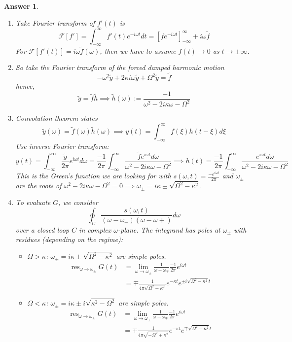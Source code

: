 \documentclass[a4paper]{article}
\DeclareMathOperator{\res}{res}
\newtheorem{ans}{Answer}[section]
\theoremstyle{new}
\begin{document}
\begin{ans}\leavevmode
\begin{enumerate}[label=(\alph*)]
\item Take Fourier transform of $f'(t)$ is
$$\mathcal{F}[f']=\int_{-\infty}^\infty f'(t)e^{-i\omega t}dt=[fe^{-i\omega t}]_{-\infty}^\infty +i\omega\tilde{f}$$
For $\mathcal{F}[f'(t)]=i\omega\tilde{f}(\omega)$, then we have to assume $f(t)\rightarrow 0$ as $t\rightarrow\pm\infty$.
\item So take the Fourier transform of the forced damped harmonic motion
$$-\omega^2\tilde{y}+2\kappa i\omega\tilde{y}+\Omega^2\tilde{y}=\tilde{f}$$
hence,
$$\tilde{y}=\tilde{f}\tilde{h}\implies\tilde{h}(\omega):=\frac{-1}{\omega^2-2i\kappa\omega-\Omega^2}$$
\item Convolution theorem states $$\tilde{y}(\omega)=\tilde{f}(\omega)\tilde{h}(\omega)\implies y(t)=\int_{-\infty}^\infty f(\xi)h(t-\xi)d\xi$$
Use inverse Fourier transform:
$$y(t)=\int_{-\infty}^\infty\frac{\tilde{y}}{2\pi}e^{i\omega t}d\omega=\frac{-1}{2\pi}\int_{-\infty}^\infty\frac{\tilde{f}e^{i\omega t}d\omega}{\omega^2-2i\kappa\omega-\Omega^2}\implies h(t)=\frac{-1}{2\pi}\int_{-\infty}^\infty\frac{e^{i\omega t}d\omega}{\omega^2-2i\kappa\omega-\Omega^2}$$
This is the Green's function we are looking for with $s(\omega,t)=\frac{-e^{i\omega t}}{2\pi}$ and $\omega_\pm$ are the roots of $\omega^2-2i\kappa\omega-\Omega^2=0\implies\omega_\pm=i\kappa\pm\sqrt{\Omega^2-\kappa^2}$.
\item To evaluate $G$, we consider
$$\oint_C\frac{s(\omega,t)}{(\omega-\omega_-)(\omega-\omega+)}d\omega$$
over a closed loop $C$ in complex $\omega$-plane. The integrand has poles at $\omega_\pm$ with residues (depending on the regime):
\begin{itemize}
    \item $\Omega>\kappa$: $\omega_\pm=i\kappa\pm \sqrt{\Omega^2-\kappa^2}$ are simple poles.
    \begin{align}
        \res_{\omega\rightarrow\omega_\pm}G(t)&=\lim_{\omega\rightarrow\omega_\pm}\frac{1}{\omega-\omega_\mp}\frac{-1}{2\pi}e^{i\omega t}\nonumber\\&=\mp\frac{1}{4\pi\sqrt{\Omega^2-\kappa^2}}e^{-\kappa t}e^{\pm i\sqrt{\Omega^2-\kappa^2}t}\nonumber
    \end{align}
    \item $\Omega<\kappa$: $\omega_\pm=i\kappa\pm i\sqrt{\kappa^2-\Omega^2}$ are simple poles.
    \begin{align}
        \res_{\omega\rightarrow\omega_\pm}G(t)&=\lim_{\omega\rightarrow\omega_\pm}\frac{1}{\omega-\omega_\mp}\frac{-1}{2\pi}e^{i\omega t}\nonumber\\&=\mp\frac{1}{4\pi\sqrt{-\Omega^2+\kappa^2}}e^{-\kappa t}e^{\mp \sqrt{\Omega^2-\kappa^2}t}\nonumber

\end{align}
\end{itemize}
\end{enumerate}
\end{ans}
\end{document}
